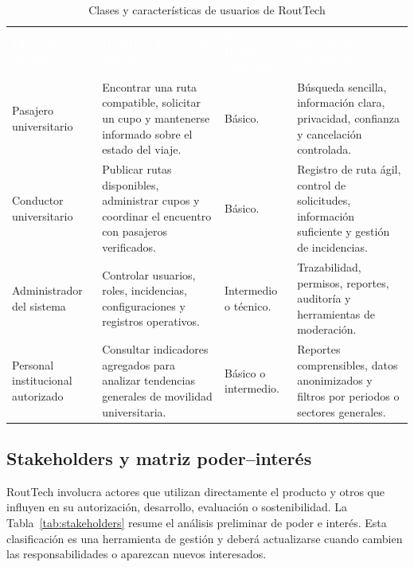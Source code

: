 \documentclass[12pt,a4paper]{article}
\begin{document}
\begin{table}[H]
\centering
\caption{Clases y características de usuarios de RoutTech}
\label{tab:clases-usuario}
\small
{}
\begin{tabularx}{\textwidth}{L{3.15cm} Y L{2.35cm} L{3.25cm}}
\textcolor{white}{\textbf{Clase de usuario}} &
\textcolor{white}{\textbf{Objetivo dentro del sistema}} &
\textcolor{white}{\textbf{Nivel técnico esperado}} &
\textcolor{white}{\textbf{Necesidades principales}}\\
Pasajero universitario & Encontrar una ruta compatible, solicitar un cupo y mantenerse informado sobre el estado del viaje. & Básico. & Búsqueda sencilla, información clara, privacidad, confianza y cancelación controlada.\\
Conductor universitario & Publicar rutas disponibles, administrar cupos y coordinar el encuentro con pasajeros verificados. & Básico. & Registro de ruta ágil, control de solicitudes, información suficiente y gestión de incidencias.\\
Administrador del sistema & Controlar usuarios, roles, incidencias, configuraciones y registros operativos. & Intermedio o técnico. & Trazabilidad, permisos, reportes, auditoría y herramientas de moderación.\\
Personal institucional autorizado & Consultar indicadores agregados para analizar tendencias generales de movilidad universitaria. & Básico o intermedio. & Reportes comprensibles, datos anonimizados y filtros por periodos o sectores generales.\\
\end{tabularx}
\end{table}

\subsection{Stakeholders y matriz poder--interés}

RoutTech involucra actores que utilizan directamente el producto y otros que influyen en su autorización, desarrollo, evaluación o sostenibilidad. La Tabla~\ref{tab:stakeholders} resume el análisis preliminar de poder e interés. Esta clasificación es una herramienta de gestión y deberá actualizarse cuando cambien las responsabilidades o aparezcan nuevos interesados.
\end{document}

